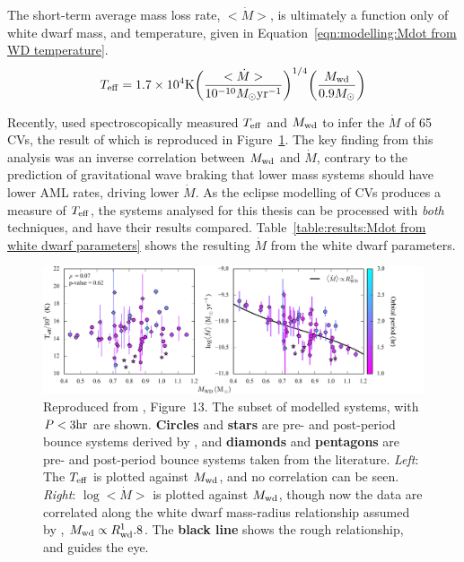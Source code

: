 The short-term average mass loss rate, $<\dot M>$, is ultimately a function only of white dwarf mass, and temperature, given in Equation~\ref{eqn:modelling:Mdot from WD temperature}.
\begin{equation}
    \label{eqn:modelling:Mdot from WD temperature}
    T_{\rm eff} = 1.7 \times 10^4 {\rm K} \bigg( \frac{<\dot M>}{10^{-10} M_\odot {\rm yr}^{-1}} \bigg)^{1/4} \bigg( \frac{M_{\rm wd}}{0.9 M_\odot} \bigg)
\end{equation}

Recently, \citet{Pala2021} used spectroscopically measured $T_{\rm eff}$ and $M_{\rm wd}$ to infer the $\dot M$ of 65 CVs, the result of which is reproduced in Figure~\ref{fig:modelling:pala2022 fig13}.
The key finding from this analysis was an inverse correlation between $M_{\rm wd}$ and $\dot M$, contrary to the prediction of gravitational wave braking that lower mass systems should have lower AML rates, driving lower $\dot M$.
As the eclipse modelling of CVs produces a measure of $T_{\rm eff}$, the systems analysed for this thesis can be processed with {\it both} techniques, and have their results compared. Table~\ref{table:results:Mdot from white dwarf parameters} shows the resulting $\dot M$ from the white dwarf parameters.
\begin{figure}
    \centering
    \includegraphics[width=\textwidth]{figures/modelling/pala_2022_fig13.png}
    \caption{Reproduced from \citet{Pala2021}, Figure~13. The subset of modelled systems, with $P < 3{\rm hr}$ are shown. {\bf Circles} and {\bf stars} are pre- and post-period bounce systems derived by \citet{Pala2021}, and {\bf diamonds} and {\bf pentagons} are pre- and post-period bounce systems taken from the literature. {\it Left}: The $T_{\rm eff}$ is plotted against $M_{\rm wd}$, and no correlation can be seen. {\it Right}: $\log<\dot M>$ is plotted against $M_{\rm wd}$, though now the data are correlated along the white dwarf mass-radius relationship assumed by \citet{Pala2021}, $M_{\rm wd} \propto R_{\rm wd}^1.8$. The {\bf black line} shows the rough relationship, and guides the eye.}
    \label{fig:modelling:pala2022 fig13}
\end{figure}


